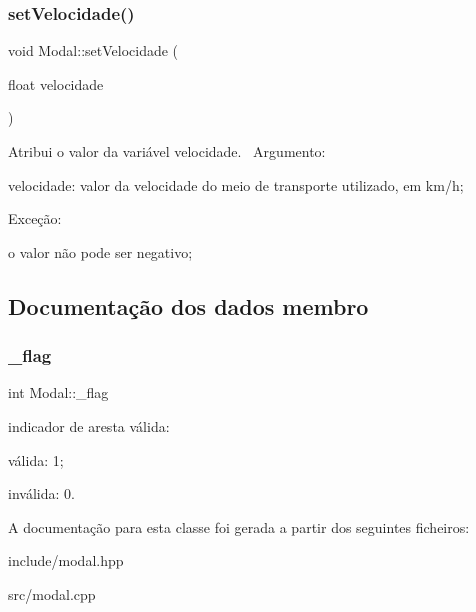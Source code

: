\subsubsection{\texorpdfstring{set\+Velocidade()}{setVelocidade()}}
{\footnotesize\ttfamily void Modal\+::set\+Velocidade (\begin{DoxyParamCaption}\item[{float}]{velocidade }\end{DoxyParamCaption})}

Atribui o valor da variável velocidade.~\newline
 Argumento\+:
\begin{DoxyItemize}
\item velocidade\+: valor da velocidade do meio de transporte utilizado, em km/h;~\newline

\end{DoxyItemize}

Exceção\+:~\newline

\begin{DoxyItemize}
\item o valor não pode ser negativo;~\newline
 
\end{DoxyItemize}

\subsection{Documentação dos dados membro}
\mbox{\label{classModal_a16ceb7e80a80e658c438afe79da01f09}} 
\subsubsection{\texorpdfstring{\+\_\+flag}{\_flag}}
{\footnotesize\ttfamily int Modal\+::\+\_\+flag\hspace{0.3cm}{\ttfamily [protected]}}



indicador de aresta válida\+: 


\begin{DoxyItemize}
\item válida\+: 1;
\item inválida\+: 0. 
\end{DoxyItemize}

A documentação para esta classe foi gerada a partir dos seguintes ficheiros\+:\begin{DoxyCompactItemize}
\item 
include/modal.\+hpp\item 
src/modal.\+cpp\end{DoxyCompactItemize}

